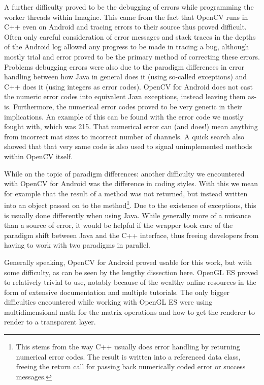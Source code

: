 A further difficulty proved to be the debugging of errors while programming the worker threads within Imagine.
This came from the fact that OpenCV runs in C++ even on Android and tracing errors to their source thus proved difficult.
Often only careful consideration of error messages and stack traces in the depths of the Android log allowed any progress to be made in tracing a bug, although mostly trial and error proved to be the primary method of correcting these errors.
Problems debugging errors were also due to the paradigm differences in error handling between how Java in general does it (using so-called exceptions) and C++ does it (using integers as error codes).
OpenCV for Android does not cast the numeric error codes into equivalent Java exceptions, instead leaving them as-is.
Furthermore, the numerical error codes proved to be very generic in their implications.
An example of this can be found with the error code we mostly fought with, which was 215.
That numerical error can (and does!) mean anything from incorrect mat sizes to incorrect number of channels.
A quick search also showed that that very same code is also used to signal unimplemented methods within OpenCV itself.

While on the topic of paradigm differences: another difficulty we encountered with OpenCV for Android was the difference in coding styles.
With this we mean for example that the result of a method was not returned, but instead written into an object passed on to the method\footnote{This stems from the way C++ usually does error handling by returning numerical error codes. The result is written into a referenced data class, freeing the return call for passing back numerically coded error or success messages.}.
Due to the existence of exceptions, this is usually done differently when using Java.
While generally more of a nuisance than a source of error, it would be helpful if the wrapper took care of the paradigm shift between Java and the C++ interface, thus freeing developers from having to work with two paradigms in parallel.

Generally speaking, OpenCV for Android proved usable for this work, but with some difficulty, as can be seen by the lengthy dissection here.
OpenGL ES proved to relatively trivial to use, notably because of the wealthy online resources in the form of extensive documentation and multiple tutorials.
The only bigger difficulties encountered while working with OpenGL ES were using multidimensional math for the matrix operations and how to get the renderer to render to a transparent layer.

